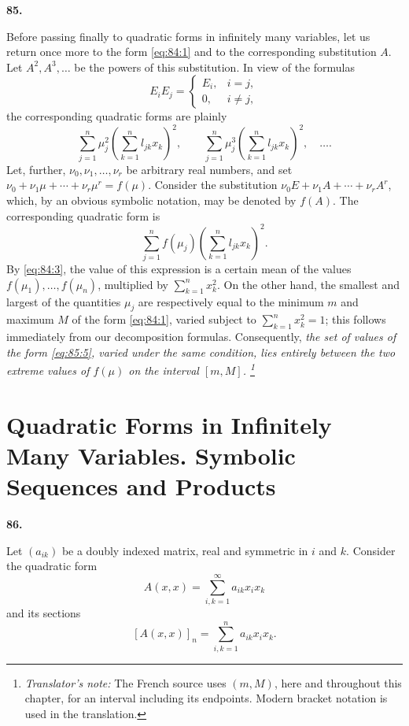\documentclass[
  paper=b5,
  fontsize=13pt,
  twoside=true,
  open=any,
  bookmarkpackage=false,
  chapterprefix=true,
  headings=normal
]{scrbook}
\theoremstyle{definition}
\newcommand{\numberedparagraph}[1]{%
  \par\medskip\phantomsection\label{sec:#1}%
  \noindent\textbf{#1.}\enspace
}
\newcounter{translatornote}
\newcommand{\translatornotelabel}{T\arabic{translatornote}}
\newcommand{\translatornote}[1]{%
  \stepcounter{translatornote}%
  \begingroup
    \edef\savedfootnotenumber{\number\value{footnote}}%
    \renewcommand{\thefootnote}{\translatornotelabel}%
    \footnote{\emph{Translator's note:} #1}%
    \setcounter{footnote}{\savedfootnotenumber}%
  \endgroup
}
\begin{document}
\numberedparagraph{85}
Before passing finally to quadratic forms in infinitely many variables, let us
return once more to the form \eqref{eq:84:1}
and to the corresponding substitution \(A\).  Let \(A^2,A^3,\ldots\) be the
powers of this substitution.  In view of the formulas
\[
  E_iE_j=\begin{cases}E_i,&i=j,\\0,&i\ne j,
  \end{cases}
\]
the corresponding quadratic forms are plainly
\[
  \sum_{j=1}^{n}\mu_j^2\left(\sum_{k=1}^{n}l_{jk}x_k\right)^2,
  \qquad
  \sum_{j=1}^{n}\mu_j^3\left(\sum_{k=1}^{n}l_{jk}x_k\right)^2,
  \quad\ldots.
\]
Let, further, \(\nu_0,\nu_1,\ldots,\nu_r\) be arbitrary real numbers, and set
\(\nu_0+\nu_1\mu+\cdots+\nu_r\mu^r=f(\mu)\).  Consider the substitution
\(\nu_0E+\nu_1A+\cdots+\nu_rA^r\), which, by an obvious symbolic notation,
may be denoted by \(f(A)\).  The corresponding quadratic form is
\begin{equation}
  \sum_{j=1}^{n}f(\mu_j)
  \left(\sum_{k=1}^{n}l_{jk}x_k\right)^2.
  \tag{5}\label{eq:85:5}
\end{equation}
By \eqref{eq:84:3}, the value of this expression is a certain mean of the
values \(f(\mu_1),\ldots,f(\mu_n)\), multiplied by
\(\sum_{k=1}^{n}x_k^2\).  On the other hand, the smallest and largest of the
quantities \(\mu_j\) are respectively equal to the minimum \(m\) and maximum
\(M\) of the form \eqref{eq:84:1}, varied subject to
\(\sum_{k=1}^{n}x_k^2=1\); this follows immediately from our decomposition
formulas.  Consequently, \emph{the set of values of the form
\eqref{eq:85:5}, varied under the same condition, lies entirely between the two
 extreme values of \(f(\mu)\) on the interval \([m,M]\).\translatornote{The French source uses \((m,M)\), here and throughout this chapter, for an interval including its endpoints.  Modern bracket notation is used in the translation.}}

\section{Quadratic Forms in Infinitely Many Variables. Symbolic Sequences and Products}

\numberedparagraph{86}
Let \((a_{ik})\) be a doubly indexed matrix, real and symmetric in \(i\) and
\(k\).  Consider the quadratic form
\begin{equation}
  A(x,x)=\sum_{i,k=1}^{\infty}a_{ik}x_ix_k
  \tag{6}\label{eq:86:6}
\end{equation}
and its sections
\[
  [A(x,x)]_n=\sum_{i,k=1}^{n}a_{ik}x_ix_k.
\]
\end{document}
